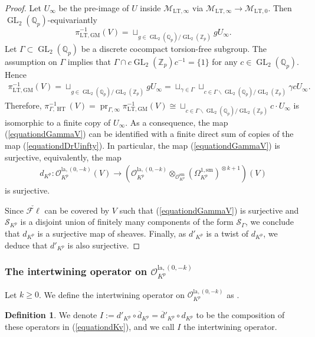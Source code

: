 \documentclass{article}
\theoremstyle{definition}
\newtheorem{definition}[theorem]{Definition}
\def\calM{\mathcal{M}}
\def\calO{\mathcal{O}}
\def\calS{\mathcal{S}}
\def\bbQ{\mathbb{Q}}
\def\bbZ{\mathbb{Z}}
\DeclareMathOperator{\ox}{\otimes}
\def\comp{\circ}
\def\isom{\cong}
\DeclareMathOperator{\pr}{pr}
\DeclareMathOperator{\GL}{GL}
\DeclareMathOperator{\HT}{HT}
\def\LT{\mathrm{LT}}
\def\lan{\mathrm{la}}
\def\sm{\mathrm{sm}}
\def\bar{\overline}
\def\fl{\mathscr{F}\ell}
\def\GM{\mathrm{GM}}
\begin{document}
\begin{proof}
Let $U_\infty$ be the pre-image of $U$ inside $\calM_{\LT,\infty}$ via $\calM_{\LT,\infty}\to \calM_{\LT,0}$. Then $\GL_2(\bbQ_p)$-equivariantly
\[\pi_{\LT,\GM}^{-1}(V)=\sqcup_{g\in \GL_2(\bbQ_p)/\GL_2(\bbZ_p)}gU_\infty.\] Let $\Gamma\subset \GL_2(\bbQ_p)$ be a discrete cocompact torsion-free subgroup. The assumption on $\Gamma$ implies that $\Gamma\cap c\GL_2(\bbZ_p)c^{-1}=\{1\}$ for any $c\in \GL_2(\bbQ_p)$. Hence 
\begin{align*}
    \pi_{\LT,\GM}^{-1}(V)=\sqcup_{g\in \GL_2(\bbQ_p)/\GL_2(\bbZ_p)}gU_\infty=\sqcup_{\gamma\in\Gamma} \sqcup_{c\in \Gamma\backslash\GL_2(\bbQ_p)/\GL_2(\bbZ_p)}\gamma c U_\infty.
\end{align*}
Therefore, $\pi_{\Gamma,\HT}^{-1}(V)=\pr_{\Gamma,\infty}\pi_{\LT,\GM}^{-1}(V)\isom  \sqcup_{c\in \Gamma\backslash \GL_2(\bbQ_p)/\GL_2(\bbZ_p)}c\cdot  U_\infty$ is isomorphic to a finite copy of $U_{\infty}$. As a consequence, the map (\ref{equationdGammaV}) can be identified with a finite direct sum of copies of the map (\ref{equationdDrUinfty}). In particular, the map (\ref{equationdGammaV}) is surjective, equivalently, the map 
\begin{align*}
    d_{K^p}:\calO_{K^p}^{\lan,(0,-k)}(V)\to (\calO_{K^p}^{\lan,(0,-k)}\ox_{\calO_{K^p}^{\sm}}(\Omega_{{K^p}}^{1,\sm})^{\ox k+1})(V)
\end{align*}
is surjective.

Since $\check{\fl}$ can be covered by $V$ such that (\ref{equationdGammaV}) is surjective and $\calS_{K^p}$ is a disjoint union of finitely many components of the form $\calS_{\Gamma}$, we conclude that $d_{K^p}$ is a surjective map of sheaves. Finally, as $d'_{K^p}$ is a twist of $d_{K^p}$, we deduce that $d'_{K^p}$ is also surjective.
\end{proof}




\subsubsection{The intertwining operator on $\calO_{K^p}^{\lan,(0,-k)}$}
Let $k\geq 0$. We define the intertwining operator on $\calO_{K^p}^{\lan,(0,-k)}$ as \cite[Definition 4.3.1]{PanII}.

\begin{definition}\label{def:intertwiningoperator}
We denote $I:=d'_{K^p}\comp\bar d_{K^p}=\bar d'_{K^p}\comp d_{K^p}$ to be the composition of these operators in (\ref{equationdKv}), and we call $I$ the intertwining operator.
\end{definition}
 
\end{document}

